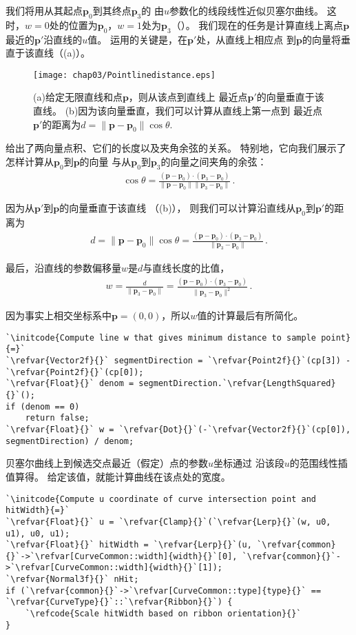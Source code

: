我们将用从其起点$\bm p_0$到其终点$\bm p_3$的
由$u$参数化的线段线性近似贝塞尔曲线。
这时，$w=0$处的位置为$\bm p_0$，$w=1$处为$\bm p_3$（）。
我们现在的任务是计算直线上离点$\bm p$最近的$\bm p'$沿直线的$u$值。
运用的关键是，在$\bm p'$处，从直线上相应点
到$\bm p$的向量将垂直于该直线（(a)）。
\begin{figure}[htbp]
    \centering\texttt{[image: chap03/Pointlinedistance.eps]}
    \caption{(a)给定无限直线和点$\bm p$，则从该点到直线上
        最近点$\bm p'$的向量垂直于该直线。
        (b)因为该向量垂直，我们可以计算从直线上第一点到
        最近点$\bm p'$的距离为$d=\|\bm p-\bm p_0\|\cos\theta$.}
    \label{fig:3.23}
\end{figure}

给出了两向量点积、它们的长度以及夹角余弦的关系。
特别地，它向我们展示了怎样计算从$\bm p_0$到$\bm p$的向量
与从$\bm p_0$到$\bm p_3$的向量之间夹角的余弦：
\begin{align*}
    \cos\theta=\frac{(\bm p-\bm p_0)\cdot(\bm p_3-\bm p_0)}{\|\bm p-\bm p_0\|\|\bm p_3-\bm p_0\|}\, .
\end{align*}

因为从$\bm p'$到$\bm p$的向量垂直于该直线
（(b)），
则我们可以计算沿直线从$\bm p_0$到$\bm p'$的距离为
\begin{align*}
    d=\|\bm p-\bm p_0\|\cos\theta=\frac{(\bm p-\bm p_0)\cdot(\bm p_3-\bm p_0)}{\|\bm p_3-\bm p_0\|}\, .
\end{align*}

最后，沿直线的参数偏移量$w$是$d$与直线长度的比值，
\begin{align*}
    w=\frac{d}{\|\bm p_3-\bm p_0\|}=\frac{(\bm p-\bm p_0)\cdot(\bm p_3-\bm p_0)}{\|\bm p_3-\bm p_0\|^2}\, .
\end{align*}

因为事实上相交坐标系中$\bm p=(0,0)$，所以$w$值的计算最后有所简化。
\begin{lstlisting}
`\initcode{Compute line w that gives minimum distance to sample point}{=}`
`\refvar{Vector2f}{}` segmentDirection = `\refvar{Point2f}{}`(cp[3]) - `\refvar{Point2f}{}`(cp[0]);
`\refvar{Float}{}` denom = segmentDirection.`\refvar{LengthSquared}{}`();
if (denom == 0)
    return false;
`\refvar{Float}{}` w = `\refvar{Dot}{}`(-`\refvar{Vector2f}{}`(cp[0]), segmentDirection) / denom;
\end{lstlisting}

贝塞尔曲线上到候选交点最近（假定）点的参数$u$坐标通过
沿该段$u$的范围线性插值算得。
给定该值，就能计算曲线在该点处的宽度。
\begin{lstlisting}
`\initcode{Compute u coordinate of curve intersection point and hitWidth}{=}`
`\refvar{Float}{}` u = `\refvar{Clamp}{}`(`\refvar{Lerp}{}`(w, u0, u1), u0, u1);
`\refvar{Float}{}` hitWidth = `\refvar{Lerp}{}`(u, `\refvar{common}{}`->`\refvar[CurveCommon::width]{width}{}`[0], `\refvar{common}{}`->`\refvar[CurveCommon::width]{width}{}`[1]);
`\refvar{Normal3f}{}` nHit;
if (`\refvar{common}{}`->`\refvar[CurveCommon::type]{type}{}` == `\refvar{CurveType}{}`::`\refvar{Ribbon}{}`) {
    `\refcode{Scale hitWidth based on ribbon orientation}{}`
}
\end{lstlisting}

